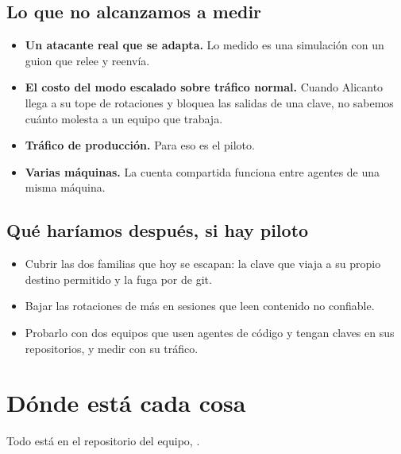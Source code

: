 \subsection{Lo que no alcanzamos a medir}

\begin{itemize}
  \item \textbf{Un atacante real que se adapta.} Lo medido es una simulación con un guion que relee y
    reenvía.
  \item \textbf{El costo del modo escalado sobre tráfico normal.} Cuando Alicanto llega a su tope de
    rotaciones y bloquea las salidas de una clave, no sabemos cuánto molesta a un equipo que trabaja.
  \item \textbf{Tráfico de producción.} Para eso es el piloto.
  \item \textbf{Varias máquinas.} La cuenta compartida funciona entre agentes de una misma máquina.
\end{itemize}

\subsection{Qué haríamos después, si hay piloto}

\begin{itemize}
  \item Cubrir las dos familias que hoy se escapan: la clave que viaja a su propio destino permitido
    y la fuga por  de git.
  \item Bajar las rotaciones de más en sesiones que leen contenido no confiable.
  \item Probarlo con dos equipos que usen agentes de código y tengan claves en sus repositorios, y
    medir con su tráfico.
\end{itemize}

\section{Dónde está cada cosa}\label{sec:donde}

Todo está en el repositorio del equipo, .

